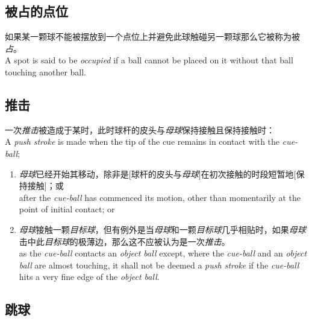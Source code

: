 \subsection{被占的点位}

\noindent 如果某一颗球不能被摆放到一个点位上并避免此球触碰另一颗球那么它被称为被\textit{占}。\\
A spot is said to be \textit{occupied} if a ball cannot be placed on it without that ball touching another ball.

\subsection{推击}

\noindent 一次\textit{推击}被造成于某时，此时球杆的皮头与\textit{母球}保持接触且保持接触时：\\
A \textit{push stroke} is made when the tip of the cue remains in contact with the \textit{cue-ball};
\begin{enumerate}[label=(\alph*)]
    \item \textit{母球}已经开始其移动，除非是[球杆的皮头与\textit{母球}]在初次接触的时段短暂地[保持接触]；或\\
    after the \textit{cue-ball} has commenced its motion, other than momentarily at the point of initial contact; or
    \item \textit{母球}接触一颗\textit{目标球}，但有例外是当\textit{母球}和一颗\textit{目标球}几乎相贴时，如果\textit{母球}击中此\textit{目标球}的极薄边，那么这不应被认为是一次\textit{推击}。\\
    as the \textit{cue-ball} contacts an \textit{object ball} except, where the \textit{cue-ball} and an \textit{object ball} are almost touching, it shall not be deemed a \textit{push stroke} if the \textit{cue-ball} hits a very fine edge of the \textit{object ball}.
\end{enumerate}

\subsection{跳球}


